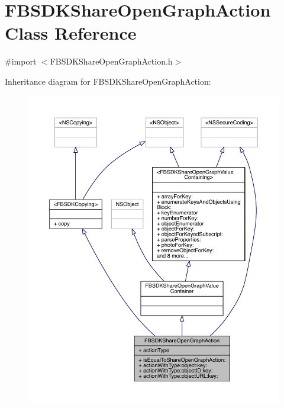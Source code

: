 \hypertarget{interface_f_b_s_d_k_share_open_graph_action}{\section{F\-B\-S\-D\-K\-Share\-Open\-Graph\-Action Class Reference}
\label{interface_f_b_s_d_k_share_open_graph_action}
}


{\ttfamily \#import $<$F\-B\-S\-D\-K\-Share\-Open\-Graph\-Action.\-h$>$}



Inheritance diagram for F\-B\-S\-D\-K\-Share\-Open\-Graph\-Action\-:
\nopagebreak
\begin{figure}[H]
\begin{center}
\leavevmode
\includegraphics[width=350pt]{interface_f_b_s_d_k_share_open_graph_action__inherit__graph}
\end{center}
\end{figure}


